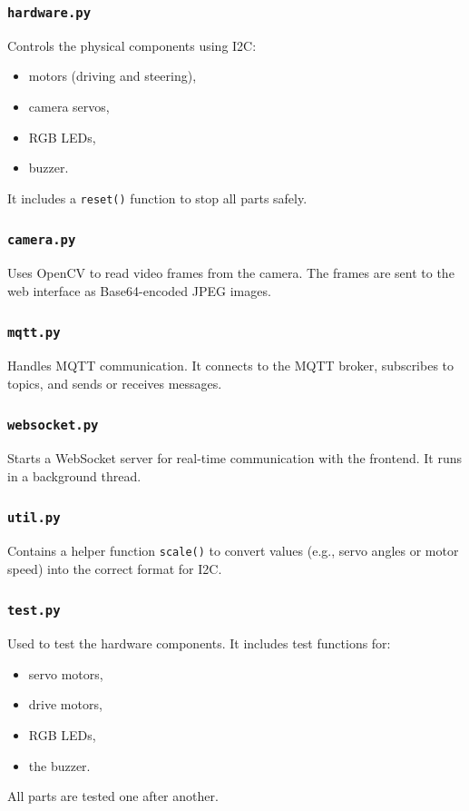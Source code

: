 \subsubsection*{\texttt{hardware.py}}
Controls the physical components using I2C:
\begin{itemize}
    \item motors (driving and steering),
    \item camera servos,
    \item RGB LEDs,
    \item buzzer.
\end{itemize}
It includes a \texttt{reset()} function to stop all parts safely.

\subsubsection*{\texttt{camera.py}}
Uses OpenCV to read video frames from the camera. The frames are sent to the web interface as Base64-encoded JPEG images.

\subsubsection*{\texttt{mqtt.py}}
Handles MQTT communication. It connects to the MQTT broker, subscribes to topics, and sends or receives messages.

\subsubsection*{\texttt{websocket.py}}
Starts a WebSocket server for real-time communication with the frontend. It runs in a background thread.

\subsubsection*{\texttt{util.py}}
Contains a helper function \texttt{scale()} to convert values (e.g., servo angles or motor speed) into the correct format for I2C.

\subsubsection*{\texttt{test.py}}
Used to test the hardware components. It includes test functions for:
\begin{itemize}
    \item servo motors,
    \item drive motors,
    \item RGB LEDs,
    \item the buzzer.
\end{itemize}
All parts are tested one after another.





